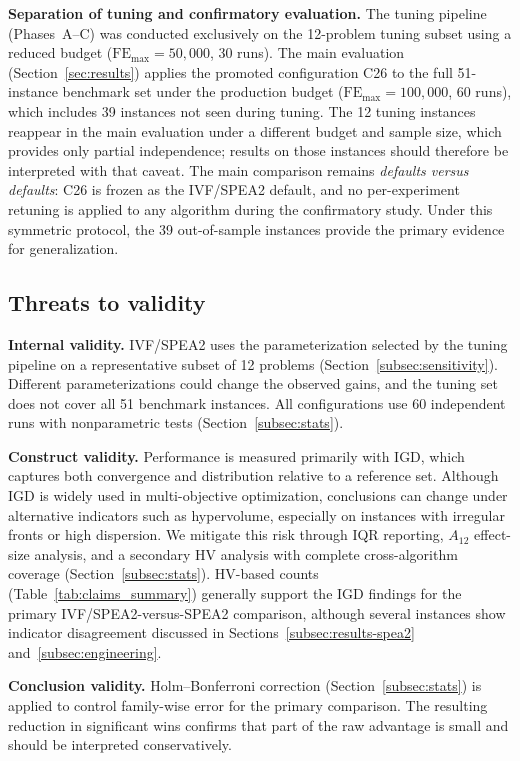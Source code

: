 \documentclass[pdflatex,sn-mathphys-ay]{sn-jnl}%
\theoremstyle{thmstyleone}%
\theoremstyle{thmstyletwo}%
\theoremstyle{thmstylethree}%
\begin{document}
\textbf{Separation of tuning and confirmatory evaluation.} The tuning pipeline (Phases~A--C) was conducted exclusively on the 12-problem tuning subset using a reduced budget ($\mathrm{FE}_{\max}=50{,}000$, 30 runs). The main evaluation (Section~\ref{sec:results}) applies the promoted configuration C26 to the full 51-instance benchmark set under the production budget ($\mathrm{FE}_{\max}=100{,}000$, 60 runs), which includes 39 instances not seen during tuning. The 12 tuning instances reappear in the main evaluation under a different budget and sample size, which provides only partial independence; results on those instances should therefore be interpreted with that caveat. The main comparison remains \emph{defaults versus defaults}: C26 is frozen as the IVF/SPEA2 default, and no per-experiment retuning is applied to any algorithm during the confirmatory study. Under this symmetric protocol, the 39 out-of-sample instances provide the primary evidence for generalization.

\subsection{Threats to validity}\label{subsec:validity}
\textbf{Internal validity.} IVF/SPEA2 uses the parameterization selected by the tuning pipeline on a representative subset of 12 problems (Section~\ref{subsec:sensitivity}). Different parameterizations could change the observed gains, and the tuning set does not cover all 51 benchmark instances. All configurations use 60 independent runs with nonparametric tests (Section~\ref{subsec:stats}).

\textbf{Construct validity.} Performance is measured primarily with IGD, which captures both convergence and distribution relative to a reference set. Although IGD is widely used in multi-objective optimization, conclusions can change under alternative indicators such as hypervolume, especially on instances with irregular fronts or high dispersion. We mitigate this risk through IQR reporting, $A_{12}$ effect-size analysis, and a secondary HV analysis with complete cross-algorithm coverage (Section~\ref{subsec:stats}). HV-based counts (Table~\ref{tab:claims_summary}) generally support the IGD findings for the primary IVF/SPEA2-versus-SPEA2 comparison, although several instances show indicator disagreement discussed in Sections~\ref{subsec:results-spea2} and~\ref{subsec:engineering}.

\textbf{Conclusion validity.} Holm--Bonferroni correction (Section~\ref{subsec:stats}) is applied to control family-wise error for the primary comparison. The resulting reduction in significant wins confirms that part of the raw advantage is small and should be interpreted conservatively.
\end{document}
